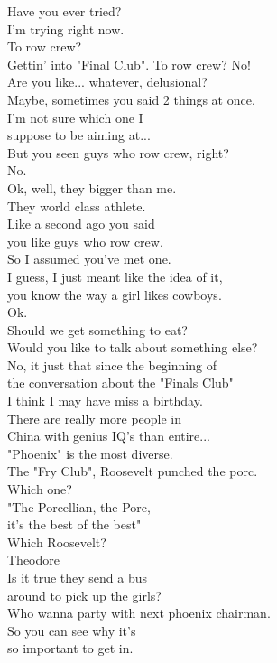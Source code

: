 \documentclass{article}
\begin{document}
\begin{multicols}{3}
Have you ever tried?\\
I'm trying right now.\\
To row crew?\\
Gettin' into "Final Club". To row crew? No!\\
Are you like... whatever, delusional?\\
Maybe, sometimes you said 2 things at once,\\
I'm not sure which one I\\
suppose to be aiming at...\\
But you seen guys who row crew, right?\\
No.\\
Ok, well, they bigger than me.\\
They world class athlete.\\
Like a second ago you said\\
you like guys who row crew.\\
So I assumed you've met one.\\
I guess, I just meant like the idea of it,\\
you know the way a girl likes cowboys.\\
Ok.\\
Should we get something to eat?\\
Would you like to talk about something else?\\
No, it just that since the beginning of\\
the conversation about the "Finals Club"\\
I think I may have miss a birthday.\\
There are really more people in\\
China with genius IQ's than entire...\\
"Phoenix" is the most diverse.\\
The "Fry Club", Roosevelt punched the porc.\\
Which one?\\
"The Porcellian, the Porc,\\
it's the best of the best"\\
Which Roosevelt?\\
Theodore\\
Is it true they send a bus\\
around to pick up the girls?\\
Who wanna party with next phoenix chairman.\\
So you can see why it's\\
so important to get in.\\

\end{multicols}
\end{document}
